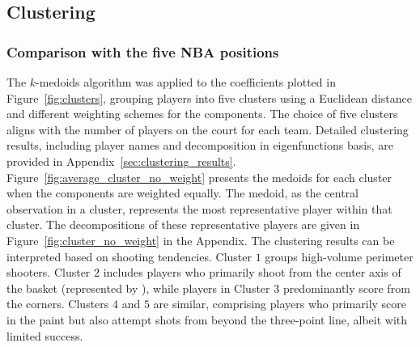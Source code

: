 \documentclass[USenglish]{article}
\theoremstyle{dgthm}
\theoremstyle{dgdef}
\begin{document}

\subsection{Clustering} %
\label{sub:clustering}

\subsubsection{Comparison with the five NBA positions}

The $k$-medoids algorithm was applied to the coefficients plotted in Figure~\ref{fig:clusters}, grouping players into five clusters using a Euclidean distance and different weighting schemes for the components. The choice of five clusters aligns with the number of players on the court for each team. Detailed clustering results, including player names and decomposition in eigenfunctions basis, are provided in Appendix~\ref{sec:clustering_results}. Figure~\ref{fig:average_cluster_no_weight} presents the medoids for each cluster when the components are weighted equally. The medoid, as the central observation in a cluster, represents the most representative player within that cluster. The decompositions of these representative players are given in Figure~\ref{fig:cluster_no_weight} in the Appendix. The clustering results can be interpreted based on shooting tendencies. Cluster $1$ groups high-volume perimeter shooters. Cluster $2$ includes players who primarily shoot from the center axis of the basket (represented by ), while players in Cluster $3$ predominantly score from the corners. Clusters $4$ and $5$ are similar, comprising players who primarily score in the paint but also attempt shots from beyond the three-point line, albeit with limited success.
\end{document}
